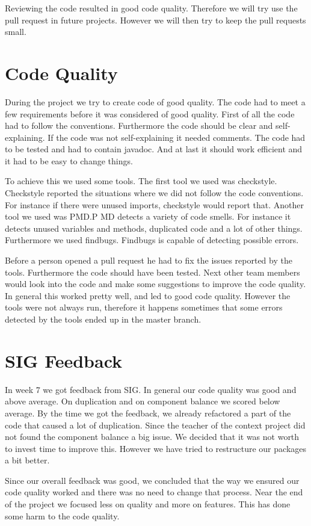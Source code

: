 Reviewing the code resulted in good code quality. Therefore we will try use the pull request in future projects. However we will then try to keep the pull requests small. 

\section{Code Quality}\label{codequality}
During the project we try to create code of good quality. The code had to meet a few requirements before it was considered of good quality. First of all the code had to follow the conventions. Furthermore the code should be clear and self-explaining. If the code was not self-explaining it needed comments. The code had to be tested and had to contain javadoc. And at last it should work efficient and it had to be easy to change things.
 
To achieve this we used some tools. The first tool we used was checkstyle. Checkstyle reported the situations where we did not follow the code conventions. For instance if there were unused imports, checkstyle would report that. 
Another tool we used was PMD.P MD detects a variety of code smells. For instance it detects unused variables and methods, duplicated code and a lot of other things.
Furthermore we used findbugs. Findbugs is capable of detecting possible errors.

Before a person opened a pull request he had to fix the issues reported by the tools. Furthermore the code should have been tested. Next other team members would look into the code and make some suggestions to improve the code quality.
In general this worked pretty well, and led to good code quality. However the tools were not always run, therefore it happens sometimes that some errors detected by the tools ended up in the master branch. 

\section{SIG Feedback}
In week 7 we got feedback from SIG. In general our code quality was good and above average. On duplication and on component balance we scored below average. By the time we got the feedback, we already refactored a part of the code that caused a lot of duplication. Since the teacher of the context project did not found the component balance a big issue. We decided that it was not worth to invest time to improve this. However we have tried to restructure our packages a bit better. 

Since our overall feedback was good, we concluded that the way we ensured our code quality worked and there was no need to change that process.
Near the end of the project we focused less on quality and more on features. This has done some harm to the code quality.